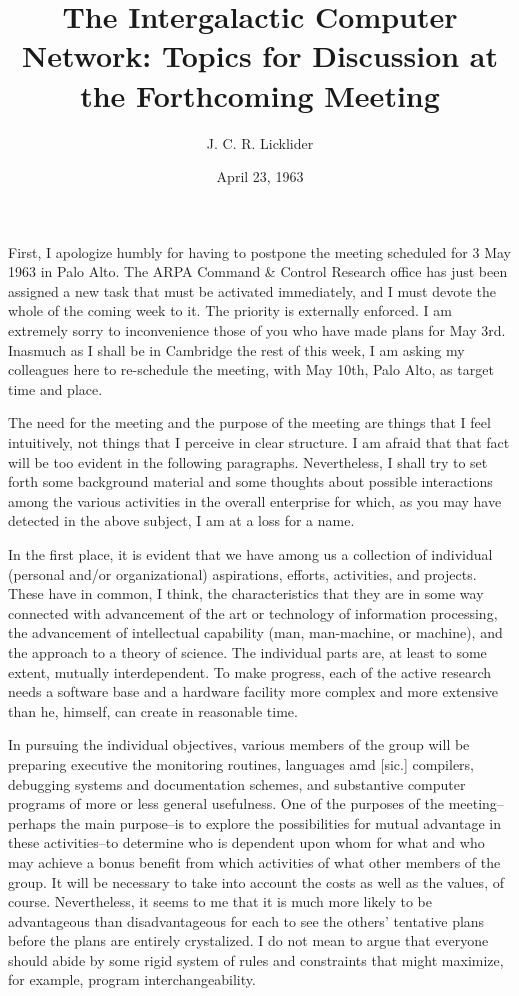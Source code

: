\documentclass{article}
\title{The Intergalactic Computer Network: Topics for Discussion at the Forthcoming Meeting}
\author{J. C. R. Licklider}
\affil{Director Behavioral Sciences Command \& Control Research, Advanced Research Projects Agency}
\date{April 23, 1963}
\begin{document}
\maketitle

First, I apologize humbly for having to postpone the meeting scheduled for 3 May 1963 in Palo Alto. The ARPA Command \& Control Research office has just been assigned a new task that must be activated immediately, and I must devote the whole of the coming week to it. The priority is externally enforced. I am extremely sorry to inconvenience those of you who have made plans for May 3rd. Inasmuch as I shall be in Cambridge the rest of this week, I am asking my colleagues here to re-schedule the meeting, with May 10th, Palo Alto, as target time and place.

The need for the meeting and the purpose of the meeting are things that I feel intuitively, not things that I perceive in clear structure. I am afraid that that fact will be too evident in the following paragraphs. Nevertheless, I shall try to set forth some background material and some thoughts about possible interactions among the various activities in the overall enterprise for which, as you may have detected in the above subject, I am at a loss for a name.

In the first place, it is evident that we have among us a collection of individual (personal and/or organizational) aspirations, efforts, activities, and projects. These have in common, I think, the characteristics that they are in some way connected with advancement of the art or technology of information processing, the advancement of intellectual capability (man, man-machine, or machine), and the approach to a theory of science. The individual parts are, at least to some extent, mutually interdependent. To make progress, each of the active research needs a software base and a hardware facility more complex and more extensive than he, himself, can create in reasonable time.

In pursuing the individual objectives, various members of the group will be preparing executive the monitoring routines, languages amd [sic.] compilers, debugging systems and documentation schemes, and substantive computer programs of more or less general usefulness. One of the purposes of the meeting--perhaps the main purpose--is to explore the possibilities for mutual advantage in these activities--to determine who is dependent upon whom for what and who may achieve a bonus benefit from which activities of what other members of the group. It will be necessary to take into account the costs as well as the values, of course. Nevertheless, it seems to me that it is much more likely to be advantageous than disadvantageous for each to see the others' tentative plans before the plans are entirely crystalized. I do not mean to argue that everyone should abide by some rigid system of rules and constraints that might maximize, for example, program interchangeability.
\end{document}
